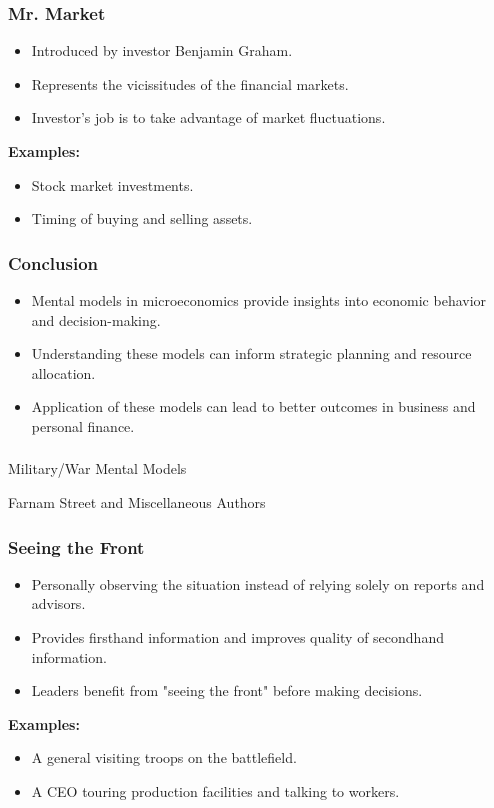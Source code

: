 \begin{frame}[fragile]\frametitle{Mr. Market}
\begin{itemize}
    \item Introduced by investor Benjamin Graham.
    \item Represents the vicissitudes of the financial markets.
    \item Investor's job is to take advantage of market fluctuations.
\end{itemize}
\textbf{Examples:}
\begin{itemize}
    \item Stock market investments.
    \item Timing of buying and selling assets.
\end{itemize}
\end{frame}

\begin{frame}[fragile]\frametitle{Conclusion}
\begin{itemize}
    \item Mental models in microeconomics provide insights into economic behavior and decision-making.
    \item Understanding these models can inform strategic planning and resource allocation.
    \item Application of these models can lead to better outcomes in business and personal finance.
\end{itemize}
\end{frame}


\begin{frame}[fragile]\frametitle{}
\begin{center}
{\Large Military/War Mental Models}

{\tiny Farnam Street and Miscellaneous Authors }


\end{center}
\end{frame}

\begin{frame}[fragile]\frametitle{Seeing the Front}
\begin{itemize}
    \item Personally observing the situation instead of relying solely on reports and advisors.
    \item Provides firsthand information and improves quality of secondhand information.
    \item Leaders benefit from "seeing the front" before making decisions.
\end{itemize}
\textbf{Examples:}
\begin{itemize}
    \item A general visiting troops on the battlefield.
    \item A CEO touring production facilities and talking to workers.
\end{itemize}
\end{frame}

